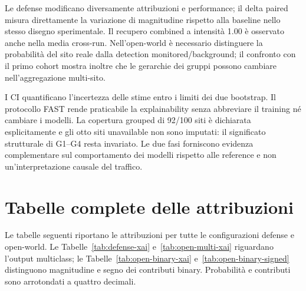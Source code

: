 \documentclass[11pt,a4paper]{article}
\begin{document}
Le defense modificano diversamente attribuzioni e performance; il delta paired misura direttamente la variazione di magnitudine rispetto alla baseline nello stesso disegno sperimentale. Il recupero combined a intensità 1.00 è osservato anche nella media cross-run. Nell'open-world è necessario distinguere la probabilità del sito reale dalla detection monitored/background; il confronto con il primo cohort mostra inoltre che le gerarchie dei gruppi possono cambiare nell'aggregazione multi-sito.

I CI quantificano l'incertezza delle stime entro i limiti dei due bootstrap. Il protocollo FAST rende praticabile la explainability senza abbreviare il training né cambiare i modelli. La copertura grouped di 92/100 siti è dichiarata esplicitamente e gli otto siti unavailable non sono imputati: il significato strutturale di G1--G4 resta invariato. Le due fasi forniscono evidenza complementare sul comportamento dei modelli rispetto alle reference e non un'interpretazione causale del traffico.

\clearpage
\appendix
\section{Tabelle complete delle attribuzioni}
Le tabelle seguenti riportano le attribuzioni per tutte le configurazioni defense e open-world. Le Tabelle~\ref{tab:defense-xai} e~\ref{tab:open-multi-xai} riguardano l'output multiclass; le Tabelle~\ref{tab:open-binary-xai} e~\ref{tab:open-binary-signed} distinguono magnitudine e segno dei contributi binary. Probabilità e contributi sono arrotondati a quattro decimali.
\end{document}
